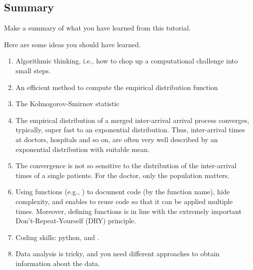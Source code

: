 \subsection{Summary}
\label{sec:summary-1}

\begin{exercise}
  Make a summary of what you have learned from this tutorial.
\begin{solution}
    Here are some ideas you should have learned.
    \begin{enumerate}
    \item Algorithmic thinking, i.e., how to chop up a computational challenge into small steps.
    \item An efficient method to compute the empirical distribution function
    \item The Kolmogorov-Smirnov statistic
    \item The empirical distribution of a merged inter-arrival arrival process converges, typically, super fast to an exponential distribution.
      Thus, inter-arrival times at doctors, hospitals and so on, are often very well described by an exponential distribution with suitable mean.
    \item The convergence is not so sensitive to the distribution of the inter-arrival times of a single patients.
      For the doctor, only the population matters.
    \item Using functions (e.g., ) to document code (by the function name), hide complexity, and enables to reuse code so that it can be applied multiple times.
      Moreover, defining functions is in line with the extremely important Don't-Repeat-Yourself (DRY) principle.
    \item Coding skills: python,  and .
    \item Data analysis is tricky, and you need different approaches to obtain information about the data.
    \end{enumerate}
  \end{solution}
\end{exercise}

